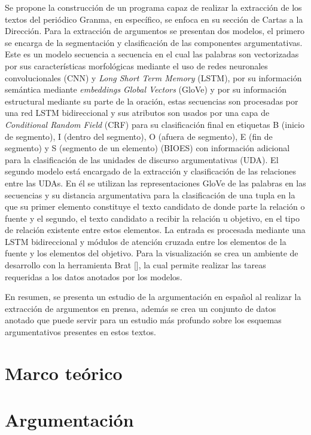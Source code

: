 \documentclass[a4paper,11pt,twocolumn,twoside]{article}
\begin{document}
Se propone la construcción de un programa capaz de realizar la extracción de los textos del periódico Granma, 
en específico, se enfoca en su sección de Cartas a la Dirección. Para la extracción
de argumentos se presentan dos modelos, el primero se encarga de la segmentación y clasificación
de las componentes argumentativas. Este es un modelo secuencia a secuencia en el cual las palabras 
son vectorizadas por sus características morfológicas mediante el uso de redes neuronales convolucionales
(CNN) y \textit{Long Short Term Memory} (LSTM), por su información
semántica mediante \textit{embeddings} \textit{Global Vectors} (GloVe) y por su información 
estructural mediante su parte de la oración, estas 
secuencias son procesadas por una red LSTM bidireccional y sus atributos son usados por una capa 
de \textit{Conditional Random Field} (CRF) 
para su clasificación final en etiquetas B (inicio de segmento), I (dentro del segmento), O (afuera de segmento), 
E (fin de segmento) y S (segmento de un elemento) (BIOES) con información adicional para la clasificación de las 
unidades de discurso argumentativas (UDA). El segundo modelo está encargado de la extracción y clasificación 
de las relaciones entre las UDAs. En él se utilizan las representaciones GloVe de las palabras en las secuencias 
y su distancia argumentativa para la clasificación de una tupla en la que su primer elemento 
constituye el texto candidato de donde parte la relación o fuente y el segundo, el texto candidato a recibir la 
relación u objetivo, en el tipo de relación existente entre estos elementos. La entrada es procesada mediante 
una LSTM bidireccional y módulos de atención cruzada entre los elementos de la fuente y los elementos del objetivo.
Para la visualización se crea un ambiente de desarrollo con la herramienta Brat [\cite{brat}], la cual permite realizar las 
tareas requeridas a los datos anotados por los modelos.

En resumen, se presenta un estudio de la argumentación en español al realizar la extracción de 
argumentos en prensa, además se crea un conjunto de datos anotado que puede servir
para un estudio más profundo sobre los esquemas argumentativos presentes en estos textos. 

\section{Marco teórico}


\section{Argumentación}
\end{document}
